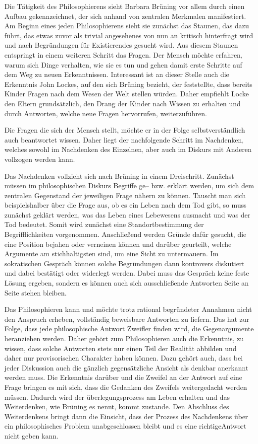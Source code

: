 Die Tätigkeit des Philosophierens sieht Barbara Brüning vor allem durch einen Aufbau gekennzeichnet, der sich anhand von zentralen Merkmalen manifestiert. 
Am Beginn eines jeden Philosophierens sieht sie zunächst das Staunen, das dazu führt, das etwas zuvor als trivial angesehenes von nun an kritisch hinterfragt wird und nach Begründungen für Existierendes gesucht wird. 
Aus diesem Staunen entspringt in einem weiteren Schritt das Fragen. 
Der Mensch möchte erfahren, warum sich Dinge verhalten, wie sie es tun und gehen damit \glqq erste Schritte auf dem Weg zu neuen Erkenntnissen\grqq{}\cite[S.\,10]{BB10}. 
Interessant ist an dieser Stelle auch die Erkenntnis John Lockes, auf den sich Brüning bezieht, der feststellte, dass bereits Kinder Fragen nach dem Wesen der Welt stellen würden. 
Daher empfiehlt Locke den Eltern grundsätzlich, den Drang der Kinder nach Wissen zu erhalten und durch Antworten, welche neue Fragen hervorrufen, weiterzuführen.

Die Fragen die sich der Mensch stellt, möchte er in der Folge selbstverständlich auch beantwortet wissen. 
Daher liegt der nachfolgende Schritt im Nachdenken, welches sowohl im Nachdenken des Einzelnen, aber auch im Diskurs mit Anderen vollzogen werden kann. 

Das Nachdenken vollzieht sich nach Brüning in einem Dreischritt. 
Zunächst müssen im philosophischen Diskurs Begriffe ge-- bzw. erklärt werden, um sich dem zentralen Gegenstand der jeweiligen Frage nähern zu können. 
Tauscht man sich beispielshalber über die Frage aus, ob es ein Leben nach dem Tod gibt, so muss zunächst geklärt werden, was das Leben eines Lebewesens ausmacht und was der Tod bedeutet. 
Somit wird zunächst eine Standortbestimmung der Begrifflichkeiten vorgenommen. 
Anschließend werden Gründe dafür gesucht, die eine Position bejahen oder verneinen können und darüber geurteilt, welche Argumente am stichhaltigsten sind, um eine Sicht zu untermauern. 
Im sokratischen Gespräch können solche Begründungen dann kontrovers diskutiert und dabei bestätigt oder widerlegt werden. 
Dabei muss das Gespräch keine feste Lösung ergeben, sondern es können auch sich ausschließende Antworten Seite an Seite stehen bleiben\cite[S.\,11]{BB10}.

Das Philosophieren kann und möchte trotz rational begründeter Annahmen nicht den Anspruch erheben, vollständig beweisbare Antworten zu liefern. 
Das hat zur Folge, dass jede philosophische Antwort Zweifler finden wird, die Gegenargumente heranziehen werden. 
Daher gehört zum Philosophieren auch die Erkenntnis, zu wissen, dass solche Antworten stets nur einen Teil der Realität abbilden und daher nur provisorischen Charakter haben können. 
Dazu gehört auch, dass bei jeder Diskussion auch die gänzlich gegensätzliche Ansicht als denkbar anerkannt werden muss. 
Die Erkenntnis darüber und die Zweifel an der Antwort auf eine Frage bringen es mit sich, dass die Gedanken des Zweifels weitergedacht werden müssen. 
Dadurch wird der überlegungsprozess am Leben erhalten und das Weiterdenken, wie Brüning es nennt, kommt zustande. 
Den Abschluss des Weiterdenkens bringt dann die Einsicht, \glqq dass der Prozess des Nachdenkens über ein philosophisches Problem unabgeschlossen bleibt\grqq{}\cite[S.\,13]{BB10} und es eine \glqq richtige\grqq Antwort nicht geben kann.


